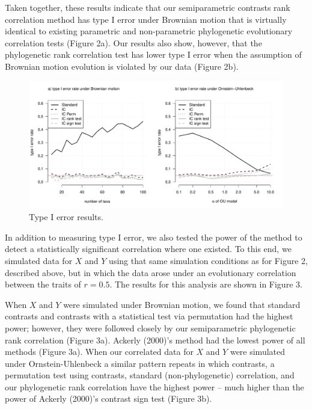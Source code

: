 \documentclass[fleqn,10pt,lineno]{wlpeerj} %
\begin{document}
Taken together, these results indicate that our semiparametric contrasts rank correlation method has type I error under Brownian motion that is virtually identical to existing parametric and non-parametric phylogenetic evolutionary correlation tests (Figure 2a). Our results also show, however, that the phylogenetic rank correlation test has lower type I error when the assumption of Brownian motion evolution is violated by our data (Figure 2b).

\begin{figure}
\includegraphics[width=1\linewidth]{Harmon-and-Revell_NonParametricPCM.PeerJ_files/figure-latex/Harmon-fig2-1} \caption{Type I error results.}\label{fig:Harmon-fig2}
\end{figure}

In addition to measuring type I error, we also tested the power of the method to detect a statistically significant correlation where one existed. To this end, we simulated data for \(X\) and \(Y\) using that same simulation conditions as for Figure 2, described above, but in which the data arose under an evolutionary correlation between the traits of \(r = 0.5\). The results for this analysis are shown in Figure 3.

When \(X\) and \(Y\) were simulated under Brownian motion, we found that standard contrasts and contrasts with a statistical test via permutation had the highest power; however, they were followed closely by our semiparametric phylogenetic rank correlation (Figure 3a). Ackerly (2000)'s method had the lowest power of all methods (Figure 3a). When our correlated data for \(X\) and \(Y\) were simulated under Ornstein-Uhlenbeck a similar pattern repeats in which contrasts, a permutation test using contrasts, standard (non-phylogenetic) correlation, and our phylogenetic rank correlation have the highest power -- much higher than the power of Ackerly (2000)'s contrast sign test (Figure 3b).
\end{document}

